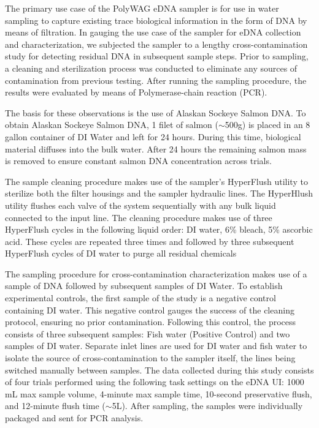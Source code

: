 \documentclass[11pt, letterpaper]{article}
\begin{document}
The primary use case of the PolyWAG eDNA sampler is for use in water sampling to capture existing trace biological information in the form of DNA by means of filtration. In gauging the use case of the sampler for eDNA collection and characterization, we subjected the sampler to a lengthy cross-contamination study for detecting residual DNA in subsequent sample steps. Prior to sampling, a cleaning and sterilization process was conducted to eliminate any sources of contamination from previous testing. After running the sampling procedure, the results were evaluated by means of Polymerase-chain reaction (PCR).
\newline\par\noindent
The basis for these observations is the use of Alaskan Sockeye Salmon DNA. To obtain Alaskan Sockeye Salmon DNA, 1 filet of salmon ($\sim$500g) is placed in an 8 gallon container of DI Water and left for 24 hours. During this time, biological material diffuses into the bulk water. After 24 hours the remaining salmon mass is removed to ensure constant salmon DNA concentration across trials.
\newline\par\noindent
The sample cleaning procedure makes use of the sampler’s HyperFlush utility to sterilize both the filter housings and the sampler hydraulic lines. The HyperHlush utility flushes each valve of the system sequentially with any bulk liquid connected to the input line. The cleaning procedure makes use of three HyperFlush cycles in the following liquid order: DI water, 6\% bleach, 5\% ascorbic acid. These cycles are repeated three times and followed by three subsequent HyperFlush cycles of DI water to purge all residual chemicals
\newline\par\noindent
The sampling procedure for cross-contamination characterization makes use of a sample of DNA followed by subsequent samples of DI Water. To establish experimental controls, the first sample of the study is a negative control containing DI water. This negative control gauges the success of the cleaning protocol, ensuring no prior contamination. Following this control, the process consists of three subsequent samples: Fish water (Positive Control) and two samples of DI water. Separate inlet lines are used for DI water and fish water to isolate the source of cross-contamination to the sampler itself, the lines being switched manually between samples. The data collected during this study consists of four trials performed using the following task settings on the eDNA UI: 1000 mL max sample volume, 4-minute max sample time, 10-second preservative flush, and 12-minute flush time ($\sim$5L). After sampling, the samples were individually packaged and sent for PCR analysis. 
\end{document}
